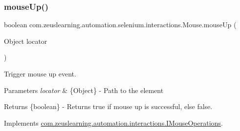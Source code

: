 \subsubsection{\texorpdfstring{mouse\+Up()}{mouseUp()}\hspace{0.1cm}{\footnotesize\ttfamily [1/2]}}
{\footnotesize\ttfamily boolean com.\+zeuslearning.\+automation.\+selenium.\+interactions.\+Mouse.\+mouse\+Up (\begin{DoxyParamCaption}\item[{Object}]{locator }\end{DoxyParamCaption})\hspace{0.3cm}{\ttfamily [inline]}}

Trigger mouse up event.


\begin{DoxyParams}{Parameters}
{\em locator} & \{Object\} -\/ Path to the element \\
\hline
\end{DoxyParams}
\begin{DoxyReturn}{Returns}
\{boolean\} -\/ Returns {\ttfamily true} if mouse up is successful, else false. 
\end{DoxyReturn}


Implements \hyperlink{interfacecom_1_1zeuslearning_1_1automation_1_1interactions_1_1IMouseOperations_ad30fa777ed68e069dc06a8ebb219eaed}{com.\+zeuslearning.\+automation.\+interactions.\+I\+Mouse\+Operations}.


